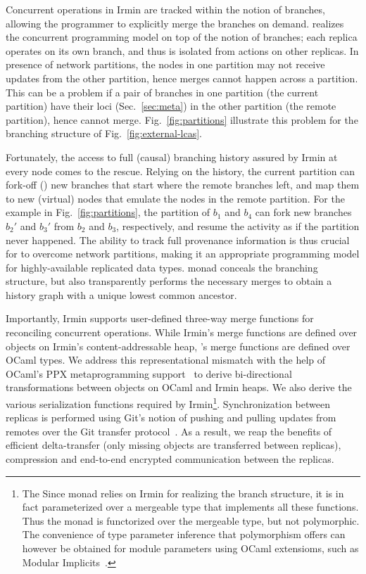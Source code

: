 Concurrent operations in Irmin are tracked within the notion of branches,
allowing the programmer to explicitly merge the branches on demand. \name
realizes the concurrent programming model on top of the notion of branches;
each replica operates on its own branch, and thus is isolated from actions on
other replicas. In presence of network partitions, the nodes in one partition
may not receive updates from the other partition, hence merges cannot
happen across a partition. This can be a problem if a pair of branches
in one partition (the current partition) have their loci
(Sec.~\ref{sec:meta}) in the other partition (the remote partition),
hence cannot merge. Fig.~\ref{fig:partitions} illustrate this problem
for the branching structure of
Fig.~\ref{fig:external-lcas}.

Fortunately, the access to full (causal) branching history assured by
Irmin at every node comes to the rescue. Relying on the history, the
current partition can fork-off () new branches that start
where the remote branches left, and map them to new (virtual) nodes
that emulate the nodes in the remote partition. For the example in
Fig.~\ref{fig:partitions}, the partition of $b_1$ and $b_4$ can fork
new branches $b_2'$ and $b_3'$ from $b_2$ and $b_3$, respectively, and
resume the activity as if the partition never happened. The ability to
track full provenance information is thus crucial for \name to
overcome network partitions, making it an appropriate programming
model for highly-available replicated data types. \name monad conceals
the branching structure, but also transparently performs the necessary
merges to obtain a history graph with a unique lowest common ancestor.

Importantly, Irmin supports user-defined three-way merge functions for
reconciling concurrent operations. While Irmin's merge functions are
defined over objects on Irmin's content-addressable heap, \name's
merge functions are defined over OCaml types. We address this
representational mismatch with the help of OCaml's PPX metaprogramming
support~\cite{ppx} to derive bi-directional transformations between
objects on OCaml and Irmin heaps. We also derive the various
serialization functions required by Irmin\footnote{
  The Since \nameMonad monad relies on Irmin for realizing the branch
  structure, it is in fact parameterized over a mergeable type that
  implements all these functions. Thus the monad is functorized over
  the mergeable type, but not polymorphic. The convenience of type
  parameter inference that polymorphism offers can however be obtained
  for module parameters using OCaml extensioms, such as Modular
  Implicits~\cite{implicits}.
}.
Synchronization between replicas is performed using Git's notion of
pushing and pulling updates from remotes over the Git transfer
protocol~\cite{git-tp}. As a result, we reap the benefits of efficient
delta-transfer (only missing objects are transferred between
replicas), compression and end-to-end encrypted communication between
the replicas.
